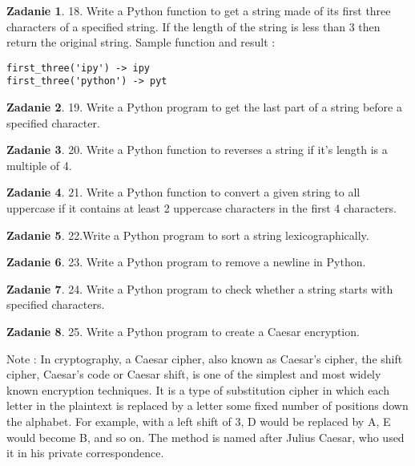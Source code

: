 \documentclass[11pt]{article}
\theoremstyle{definition}
\newtheorem{zadanie}{Zadanie}
\begin{document}
\begin{zadanie}


18. Write a Python function to get a string made of its first three characters of a specified string. If the length of the string is less than 3 then return the original string. 
Sample function and result :
\begin{verbatim}
first_three('ipy') -> ipy
first_three('python') -> pyt
\end{verbatim}
\end{zadanie}

\begin{zadanie}


19. Write a Python program to get the last part of a string before a specified character.
\end{zadanie}

\begin{zadanie}


20. Write a Python function to reverses a string if it's length is a multiple of 4.
\end{zadanie}

\begin{zadanie}


21. Write a Python function to convert a given string to all uppercase if it contains at least 2 uppercase characters in the first 4 characters. 

\end{zadanie}

\begin{zadanie}


22.Write a Python program to sort a string lexicographically. 

\end{zadanie}

\begin{zadanie}


23. Write a Python program to remove a newline in Python. 

\end{zadanie}

\begin{zadanie}


24. Write a Python program to check whether a string starts with specified characters. 

\end{zadanie}

\begin{zadanie}


25. Write a Python program to create a Caesar encryption. 

Note : In cryptography, a Caesar cipher, also known as Caesar's cipher, the shift cipher, Caesar's code or Caesar shift, is one of the simplest and most widely known encryption techniques. It is a type of substitution cipher in which each letter in the plaintext is replaced by a letter some fixed number of positions down the alphabet. For example, with a left shift of 3, D would be replaced by A, E would become B, and so on. The method is named after Julius Caesar, who used it in his private correspondence.


\end{zadanie}
\end{document}

